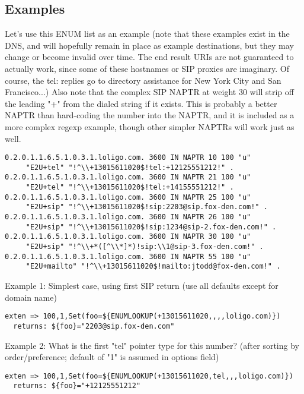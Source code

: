 \subsection{Examples}

Let's use this ENUM list as an example (note that these examples exist
in the DNS, and will hopefully remain in place as example
destinations, but they may change or become invalid over time.  The
end result URIs are not guaranteed to actually work, since some of
these hostnames or SIP proxies are imaginary.  Of course, the tel:
replies go to directory assistance for New York City and San
Francisco...)  Also note that the complex SIP NAPTR at weight 30 will
strip off the leading "+" from the dialed string if it exists.  This
is probably a better NAPTR than hard-coding the number into the NAPTR,
and it is included as a more complex regexp example, though other
simpler NAPTRs will work just as well.

\begin{verbatim}
0.2.0.1.1.6.5.1.0.3.1.loligo.com. 3600 IN NAPTR 10 100 "u" 
     "E2U+tel" "!^\\+13015611020$!tel:+12125551212!" .
0.2.0.1.1.6.5.1.0.3.1.loligo.com. 3600 IN NAPTR 21 100 "u" 
     "E2U+tel" "!^\\+13015611020$!tel:+14155551212!" .
0.2.0.1.1.6.5.1.0.3.1.loligo.com. 3600 IN NAPTR 25 100 "u" 
     "E2U+sip" "!^\\+13015611020$!sip:2203@sip.fox-den.com!" .
0.2.0.1.1.6.5.1.0.3.1.loligo.com. 3600 IN NAPTR 26 100 "u" 
     "E2U+sip" "!^\\+13015611020$!sip:1234@sip-2.fox-den.com!" .
0.2.0.1.1.6.5.1.0.3.1.loligo.com. 3600 IN NAPTR 30 100 "u" 
     "E2U+sip" "!^\\+*([^\\*]*)!sip:\\1@sip-3.fox-den.com!" .
0.2.0.1.1.6.5.1.0.3.1.loligo.com. 3600 IN NAPTR 55 100 "u" 
     "E2U+mailto" "!^\\+13015611020$!mailto:jtodd@fox-den.com!" .
\end{verbatim}

Example 1: Simplest case, using first SIP return (use all defaults
except for domain name)
\begin{verbatim}
exten => 100,1,Set(foo=${ENUMLOOKUP(+13015611020,,,,loligo.com)})
  returns: ${foo}="2203@sip.fox-den.com"
\end{verbatim}

Example 2: What is the first "tel" pointer type for this number?
(after sorting by order/preference; default of "1" is assumed in
options field)
\begin{verbatim}
exten => 100,1,Set(foo=${ENUMLOOKUP(+13015611020,tel,,,loligo.com)})
  returns: ${foo}="+12125551212"
\end{verbatim}

